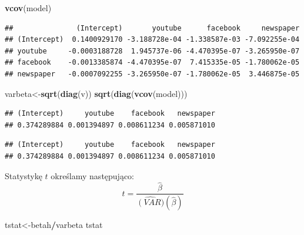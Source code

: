 \documentclass[]{article}
\newenvironment{Shaded}{\begin{snugshade}}{\end{snugshade}}
\newcommand{\KeywordTok}[1]{\textcolor[rgb]{0.13,0.29,0.53}{\textbf{#1}}}
\newcommand{\DecValTok}[1]{\textcolor[rgb]{0.00,0.00,0.81}{#1}}
\newcommand{\OperatorTok}[1]{\textcolor[rgb]{0.81,0.36,0.00}{\textbf{#1}}}
\newcommand{\NormalTok}[1]{#1}
\begin{document}
\begin{Shaded}
\begin{Highlighting}[]
\KeywordTok{vcov}\NormalTok{(model)}
\end{Highlighting}
\end{Shaded}

\begin{verbatim}
##               (Intercept)       youtube      facebook     newspaper
## (Intercept)  0.1400929170 -3.188728e-04 -1.338587e-03 -7.092255e-04
## youtube     -0.0003188728  1.945737e-06 -4.470395e-07 -3.265950e-07
## facebook    -0.0013385874 -4.470395e-07  7.415335e-05 -1.780062e-05
## newspaper   -0.0007092255 -3.265950e-07 -1.780062e-05  3.446875e-05
\end{verbatim}

\begin{Shaded}
\begin{Highlighting}[]
\NormalTok{varbeta<-}\KeywordTok{sqrt}\NormalTok{(}\KeywordTok{diag}\NormalTok{(v))}
\KeywordTok{sqrt}\NormalTok{(}\KeywordTok{diag}\NormalTok{(}\KeywordTok{vcov}\NormalTok{(model)))}
\end{Highlighting}
\end{Shaded}

\begin{verbatim}
## (Intercept)     youtube    facebook   newspaper 
## 0.374289884 0.001394897 0.008611234 0.005871010
\end{verbatim}

\begin{Shaded}
\end{Shaded}

\begin{verbatim}
## (Intercept)     youtube    facebook   newspaper 
## 0.374289884 0.001394897 0.008611234 0.005871010
\end{verbatim}

Statystykę \(t\) określamy następująco:
\[t=\frac{\hat{\beta}}{\widehat{\operatorname(VAR)}(\hat{\beta})}\]

\begin{Shaded}
\begin{Highlighting}[]
\NormalTok{tstat<-betah}\OperatorTok{/}\NormalTok{varbeta}
\NormalTok{tstat}
\end{Highlighting}
\end{Shaded}
\end{document}
